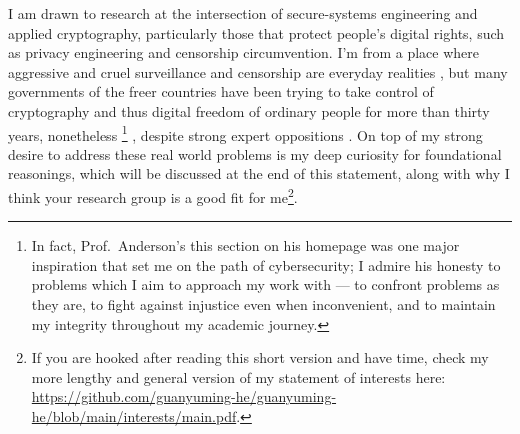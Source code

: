 \documentclass[10pt]{article}
\begin{document}
I am drawn to research at the intersection of secure-systems engineering and
applied cryptography, particularly those that protect people's digital rights,
such as privacy engineering and censorship circumvention. I'm from a place
where aggressive and cruel surveillance and censorship are everyday realities
\cite{internet.coup},
but many governments of the freer countries have been trying to take control of
cryptography and thus digital freedom of ordinary people for more than thirty
years, nonetheless \cite{anderson.freedom, review.crypto.war}\footnote{In fact,
	Prof.~Anderson's this section \cite{anderson.freedom} on his homepage was
	one major inspiration that set me on the path of cybersecurity; I admire
	his honesty to problems which I aim to approach my work with --- to
	confront problems as they are, to fight against injustice even when
inconvenient, and to maintain my integrity throughout my academic journey.} ,
despite strong expert oppositions \cite{keys.under.doormats,
bugs.in.our.pockets, chatcontrolchildprotection}. On top of my strong desire to
address these real world problems is my deep curiosity for foundational
reasonings, which will be discussed at the end of this statement, along with
why I think your research group is a good fit for me\footnote{If you are hooked
	after reading this short version and have time,
	check my more lengthy and general version of my statement of interests
	here:
\url{https://github.com/guanyuming-he/guanyuming-he/blob/main/interests/main.pdf}.}.
\end{document}
